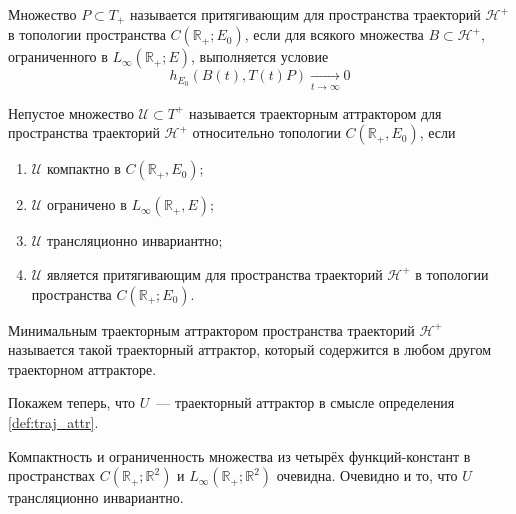 \begin{definition}
	Множество $P \subset T_+$ называется притягивающим для пространства траекторий $\mathcal{H}^+$ в топологии пространства $C(\mathbb{R}_+; E_0)$,
	если для всякого множества $B \subset \mathcal{H}^+$, ограниченного в $L_{\infty}(\mathbb{R}_+;E)$, выполняется условие
	\begin{equation}
		h_{E_0}(B(t),T(t)P) \xrightarrow[t\to\infty]{}0
	\end{equation}
\end{definition}

\begin{definition}\label{def:traj_attr}
	Непустое множество $\mathcal{U}\subset T^+$
	называется траекторным аттрактором для пространства траекторий $\mathcal{H}^+$
	относительно топологии $C(\mathbb{R}_+,E_0)$, если
	\begin{enumerate}
		\item
			$\mathcal{U}$ компактно в $C(\mathbb{R}_+,E_0)$;
		\item
			$\mathcal{U}$ ограничено в $L_{\infty}(\mathbb{R}_+,E)$;
		\item
			$\mathcal{U}$ трансляционно инвариантно;
		\item
			$\mathcal{U}$ является притягивающим для пространства траекторий $\mathcal{H}^+$
			в топологии пространства $C(\mathbb{R}_+; E_0)$.
	\end{enumerate}
\end{definition}

\begin{definition}
	Минимальным траекторным аттрактором пространства траекторий $\mathcal{H}^+$
	называется такой траекторный аттрактор, который содержится в любом другом траекторном аттракторе.
\end{definition}

Покажем теперь, что $U$~--- траекторный аттрактор в смысле определения \ref{def:traj_attr}.


Компактность и ограниченность множества из четырёх функций-констант в пространствах
$C(\mathbb{R}_+; \mathbb{R}^2)$ и $L_\infty(\mathbb{R}_+; \mathbb{R}^2)$ очевидна.
Очевидно и то, что $U$ трансляционно инвариантно.

